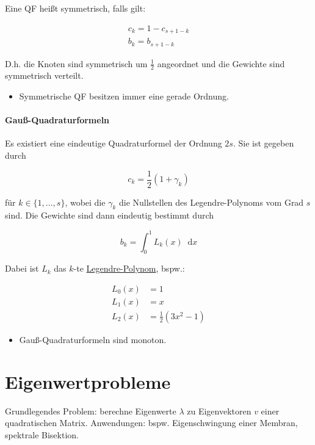 \documentclass[a4paper, 14pt]{article}
\newcommand*\diff{\mathop{}\!\mathrm{d}}
\begin{document}
	Eine QF heißt symmetrisch, falls gilt:

	\begin{eqnarray}
		c_k = 1 - c_{s + 1 - k} \\
		b_k = b_{s + 1 - k}
	\end{eqnarray}

	D.h. die Knoten sind symmetrisch um $\frac{1}{2}$ angeordnet und die Gewichte sind symmetrisch verteilt.

	\begin{itemize}
		\item Symmetrische QF besitzen immer eine gerade Ordnung.
	\end{itemize}

	\paragraph{Gauß-Quadraturformeln}

	Es existiert eine eindeutige Quadraturformel der Ordnung $2s$.
	Sie ist gegeben durch

	\begin{equation}
		c_k = \frac{1}{2}(1 + \gamma_k)
	\end{equation}

	für $k \in \{1, ..., s\}$, wobei die $\gamma_k$ die Nullstellen des Legendre-Polynoms vom Grad $s$ sind.
	Die Gewichte sind dann eindeutig bestimmt durch

	\begin{equation}
		b_k = \int_0^1{L_k(x) \diff x}
	\end{equation}

	Dabei ist $L_k$ das $k$-te \href{https://de.wikipedia.org/wiki/Legendre-Polynom}{Legendre-Polynom}, bspw.:

	\begin{align}
		L_0(x) & = 1 \\
		L_1(x) & = x \\
		L_2(x) & = \frac{1}{2}(3x^2 - 1)
	\end{align}

	\begin{itemize}
		\item Gauß-Quadraturformeln sind monoton.
	\end{itemize}

	\section{Eigenwertprobleme}

	Grundlegendes Problem: berechne Eigenwerte $\lambda$ zu Eigenvektoren $v$ einer quadratischen Matrix.
	Anwendungen: bspw. Eigenschwingung einer Membran, spektrale Bisektion.
\end{document}
